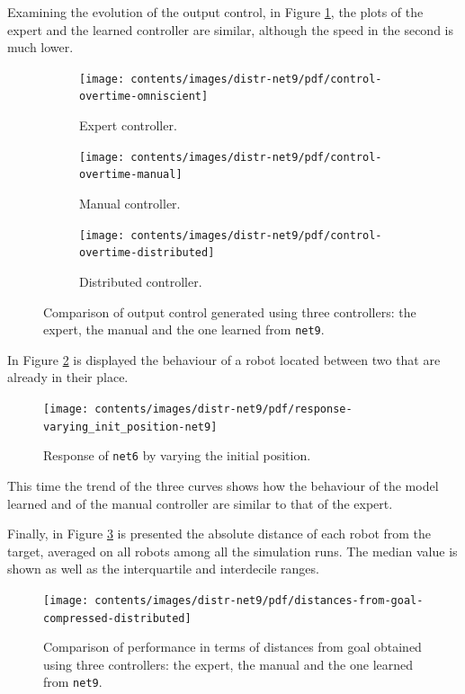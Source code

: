 Examining the evolution of the output control, in Figure \ref{fig:net9control}, 
the plots of the expert and the learned controller are similar, although the speed 
in the second is much lower.
\begin{figure}[!htb]
	\centering
	\begin{subfigure}[h]{0.3\textwidth}
		\centering
		\texttt{[image: contents/images/distr-net9/pdf/control-overtime-omniscient]}%
		\caption{Expert controller.}
	\end{subfigure}
	\hfill
	\begin{subfigure}[h]{0.3\textwidth}
		\centering
		\texttt{[image: contents/images/distr-net9/pdf/control-overtime-manual]}%
		\caption{Manual controller.}
	\end{subfigure}
	\hfill
	\begin{subfigure}[h]{0.3\textwidth}
		\centering
		\texttt{[image: contents/images/distr-net9/pdf/control-overtime-distributed]}
		\caption{Distributed controller.}
	\end{subfigure}
	\caption[Evaluation of the control learned by \texttt{net9}.]{Comparison 
		of output control generated using three controllers: the expert, the manual 
		and the one learned from \texttt{net9}.}
	\label{fig:net9control}
\end{figure}

In Figure \ref{fig:net9responseposition} is displayed the behaviour of a robot 
located between two that are already in their place.
\begin{figure}[!htb]
	\centering
	\texttt{[image: contents/images/distr-net9/pdf/response-varying\_init\_position-net9]}%
	\caption{Response of \texttt{net6} by varying the initial position.}
	\label{fig:net9responseposition}
\end{figure}
This time the trend of the three curves shows how the behaviour of the model 
learned and of the manual controller are similar to that of the expert.

Finally, in Figure \ref{fig:net9distance} is presented the absolute distance of each 
robot from the target, averaged on all robots among all the simulation runs. The 
median value is shown as well as the interquartile and interdecile ranges.
\begin{figure}[!htb]
	\centering
	\texttt{[image: contents/images/distr-net9/pdf/distances-from-goal-compressed-distributed]}%
	\caption[Evaluation of \texttt{net9} distances from goal.]{Comparison of 
		performance in terms of distances from goal obtained using three 
		controllers: the expert, the manual and the one learned from \texttt{net9}.}
	\label{fig:net9distance}
\end{figure}

